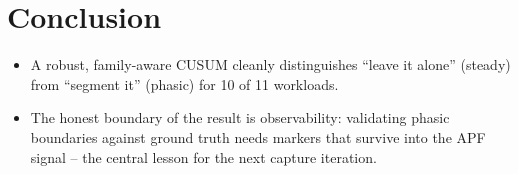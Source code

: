 \documentclass[conference]{IEEEtran}
\begin{document}
\section{Conclusion}
\begin{itemize}
  \item A robust, family-aware CUSUM cleanly distinguishes ``leave it alone''
        (steady) from ``segment it'' (phasic) for 10 of 11 workloads.
  \item The honest boundary of the result is observability: validating phasic
        boundaries against ground truth needs markers that survive into the APF
        signal -- the central lesson for the next capture iteration.
\end{itemize}



\end{document}
